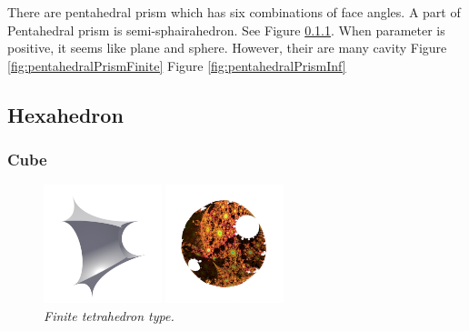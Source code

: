 \documentclass[dvipdfmx]{interact}
\theoremstyle{plain}%
\theoremstyle{definition}
\theoremstyle{remark}
\theoremstyle{problemstyle}
\begin{document}
There are pentahedral prism which has six combinations of face angles.
A part of Pentahedral prism is semi-sphairahedron.
See Figure \ref{}. When parameter is positive, it seems like plane and
sphere. However, their are many cavity
Figure \ref{fig:pentahedralPrismFinite}
Figure \ref{fig:pentahedralPrismInf}

\subsection{Hexahedron}
\subsubsection{Cube}
\begin{figure}[H]
 \begin{minipage}{0.5\textwidth}
  \begin{minipage}[t]{0.24\textwidth}
   \centering
   \includegraphics[width=1.35in, height=1.35in,
   keepaspectratio]{./img/sphairahedron/cube/sphairahedronFinite.png}
  \end{minipage}
  \hspace*{\fill}
  \begin{minipage}[t]{0.24\textwidth}
   \centering
   \includegraphics[width=1.35in, height=1.35in,
   keepaspectratio]{./img/sphairahedron/cube/limitsetFinite.png}
  \end{minipage}
  \hspace*{\fill}
  \caption{\textit{Finite tetrahedron type.}}
  \label{fig:cubeFinite}
 \end{minipage}
 \hspace*{\fill}
 \begin{minipage}{0.5\textwidth}
  \begin{minipage}[t]{0.24\textwidth}

\end{minipage}
\end{minipage}
\end{figure}
\end{document}
